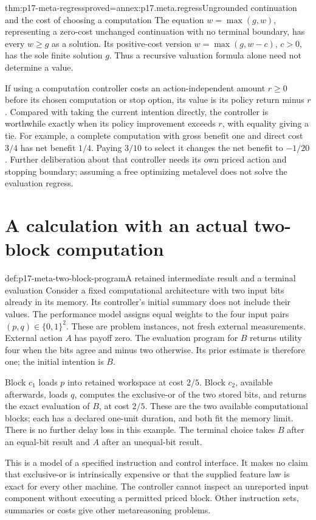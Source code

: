 \begin{hbtheorem}{thm:p17-meta-regress}{proved=annex:p17.meta.regress}{Ungrounded continuation and the cost of choosing a computation}
The equation \(w=\max(g,w)\), representing a zero-cost unchanged
continuation with no terminal boundary, has every \(w\geq g\)
as a solution. Its positive-cost version
\(w=\max(g,w-c)\), \(c>0\), has the sole finite solution \(g\).
Thus a recursive valuation formula alone need not determine a value.

If using a computation controller costs an action-independent amount
\(r\geq0\) before its chosen computation or stop option, its value
is its policy return minus \(r\). Compared with taking the current
intention directly, the controller is worthwhile exactly when its
policy improvement exceeds \(r\), with equality giving a tie.
For example, a complete computation with gross benefit one and direct
cost \(3/4\) has net benefit \(1/4\). Paying \(3/10\) to
select it changes the net benefit to \(-1/20\).
Further deliberation about that controller needs its own priced action
and stopping boundary; assuming a free optimizing metalevel does not
solve the evaluation regress.
\end{hbtheorem}

\section{A calculation with an actual two-block computation}
\label{sec:p17-meta-computation-example}

\begin{hbdefinition}{def:p17-meta-two-block-program}{A retained intermediate result and a terminal evaluation}
Consider a fixed computational architecture with two input bits already
in its memory. Its controller's initial summary does not include their
values. The performance model assigns equal weights to the four input
pairs \((p,q)\in\{0,1\}^2\). These are problem instances, not
fresh external measurements. External action \(A\) has payoff zero.
The evaluation program for \(B\) returns utility four when the bits
agree and minus two otherwise. Its prior estimate is therefore one;
the initial intention is \(B\).

Block \(c_1\) loads \(p\) into retained workspace at cost
\(2/5\). Block \(c_2\), available afterwards, loads \(q\),
computes the exclusive-or of the two stored bits, and returns the
exact evaluation of \(B\), at cost \(2/5\). These are the two
available computational blocks; each has a declared one-unit duration,
and both fit the memory limit. There is no further delay loss in this
example. The terminal choice takes \(B\) after an equal-bit result
and \(A\) after an unequal-bit result.

This is a model of a specified instruction and control interface.
It makes no claim that exclusive-or is intrinsically expensive or that
the supplied feature law is exact for every other machine. The controller
cannot inspect an unreported input component without executing a permitted
priced block. Other instruction sets, summaries or costs give other
metareasoning problems.
\end{hbdefinition}

